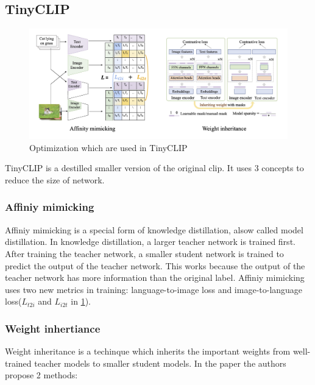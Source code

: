         \subsection{TinyCLIP
            \label{section:tinyclip}}
        \begin{figure}
            \centering
            \includegraphics[width=\textwidth]{Images/crossmodalnetworks/TinyCLIP.jpg}
            \caption{Optimization which are used in TinyCLIP\cite{tinyclip}}
            \label{fig:crossmodalnetworks:tinyclip}
        \end{figure}

        TinyCLIP\cite{tinyclip} is a destilled smaller version of the original \acrshort{clip}.
        It uses 3 concepts to reduce the size of network.

        \subsubsection{Affiniy mimicking}
        Affiniy mimicking is a special form of knowledge distillation\cite{knowledgedistillation}, alsow called model distillation.
        In knowledge distillation, a larger teacher network is trained first.
        After training the teacher network, a smaller student network is trained to predict the output of the teacher network.
        This works because the output of the teacher network has more information than the original label.
        Affiniy mimicking uses two new metrics in training: language-to-image loss and image-to-language loss(\(L_{t2i}\) and \(L_{i2t}\) in \cref{fig:crossmodalnetworks:tinyclip}).

        \subsubsection{Weight inhertiance}
        Weight inheritance is a techinque which inherits the important weights from well-trained teacher models to smaller student models.
        In the paper the authors propose 2 methods:

